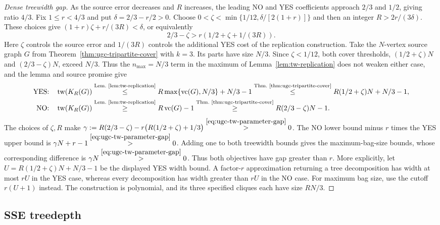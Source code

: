 \begin{proof}[Dense treewidth gap]
As the source error decreases and $R$ increases, the leading NO
and YES coefficients approach $2/3$ and $1/2$, giving ratio $4/3$.
Fix $1\le r<4/3$ and put $\delta=2/3-r/2>0$. Choose
$0<\zeta<\min\{1/12,\delta/[2(1+r)]\}$ and then an integer
$R>2r/(3\delta)$. These choices give
$(1+r)\zeta+r/(3R)<\delta$, or equivalently
\begin{equation}\label{eq:ugc-tw-parameter-gap}
 2/3-\zeta>r(1/2+\zeta+1/(3R)).
\end{equation}
Here $\zeta$ controls the source error and $1/(3R)$ controls the
additional YES cost of the replication construction.
Take the $N$-vertex source graph $G$ from Theorem~\ref{thm:ugc-tripartite-cover}
with $k=3$. Its parts have size $N/3$. Since $\zeta<1/12$, both
cover thresholds, $(1/2+\zeta)N$ and $(2/3-\zeta)N$, exceed $N/3$.
Thus the $n_{\max}=N/3$ term in the maximum of
Lemma~\ref{lem:tw-replication} does not weaken either case, and the
lemma and source promise give
\[
\begin{aligned}
 \textup{YES:}\quad \operatorname{tw}(K_R(G))
 &\overset{\text{Lem.~\ref{lem:tw-replication}}}{\leq}
 R\max\{\operatorname{vc}(G),N/3\}+N/3-1
  \overset{\text{Thm.~\ref{thm:ugc-tripartite-cover}}}{\leq}
 R(1/2+\zeta)N+N/3-1,\\
 \textup{NO:}\quad \operatorname{tw}(K_R(G))
 &\overset{\text{Lem.~\ref{lem:tw-replication}}}{\geq}
 R\operatorname{vc}(G)-1
 \overset{\text{Thm.~\ref{thm:ugc-tripartite-cover}}}{\geq}
 R(2/3-\zeta)N-1.
\end{aligned}
\]
The choices of $\zeta,R$ make
$\gamma:=R(2/3-\zeta)-r\bigl(R(1/2+\zeta)+1/3\bigr)
\overset{\eqref{eq:ugc-tw-parameter-gap}}{>}0$.
The NO lower bound minus $r$ times the YES upper bound is
$\gamma N+r-1\overset{\eqref{eq:ugc-tw-parameter-gap}}{>}0$.
Adding one to both treewidth bounds gives the
maximum-bag-size bounds, whose corresponding difference is
$\gamma N\overset{\eqref{eq:ugc-tw-parameter-gap}}{>}0$.
Thus both objectives have gap greater than $r$.
More explicitly, let $U=R(1/2+\zeta)N+N/3-1$ be the displayed
YES width bound. A factor-$r$ approximation returning a tree
decomposition has width at most $rU$ in the YES case, whereas
every decomposition has width greater than $rU$ in the NO case.
For maximum bag size, use the cutoff $r(U+1)$ instead.
The construction is polynomial, and its three specified cliques
each have size $RN/3$.
\end{proof}

\subsection{SSE treedepth}
\label{app:dense-sse-td}

